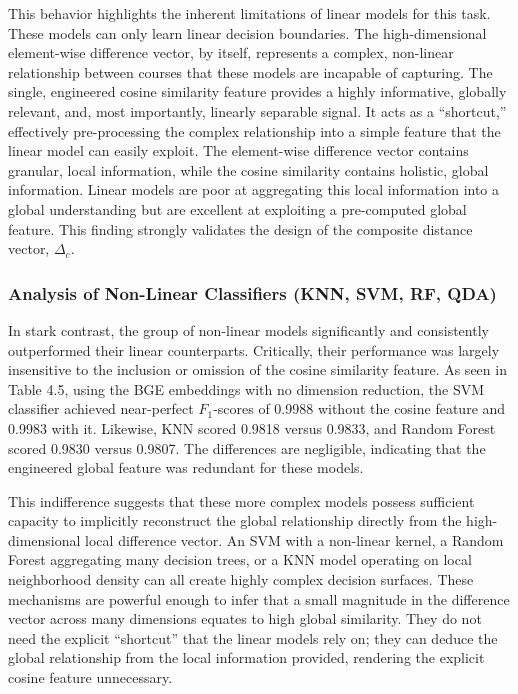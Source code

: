 This behavior highlights the inherent limitations of linear models for this task. These models can only learn linear decision boundaries. The high-dimensional element-wise difference vector, by itself, represents a complex, non-linear relationship between courses that these models are incapable of capturing. The single, engineered cosine similarity feature provides a highly informative, globally relevant, and, most importantly, linearly separable signal. It acts as a ``shortcut,'' effectively pre-processing the complex relationship into a simple feature that the linear model can easily exploit. The element-wise difference vector contains granular, local information, while the cosine similarity contains holistic, global information. Linear models are poor at aggregating this local information into a global understanding but are excellent at exploiting a pre-computed global feature. This finding strongly validates the design of the composite distance vector, \(\Delta_c\).

\subsubsection{Analysis of Non-Linear Classifiers (KNN, SVM, RF, QDA)}
In stark contrast, the group of non-linear models significantly and consistently outperformed their linear counterparts. Critically, their performance was largely insensitive to the inclusion or omission of the cosine similarity feature. As seen in Table 4.5, using the BGE embeddings with no dimension reduction, the SVM classifier achieved near-perfect \(F_1\)-scores of 0.9988 without the cosine feature and 0.9983 with it. Likewise, KNN scored 0.9818 versus 0.9833, and Random Forest scored 0.9830 versus 0.9807. The differences are negligible, indicating that the engineered global feature was redundant for these models.

This indifference suggests that these more complex models possess sufficient capacity to implicitly reconstruct the global relationship directly from the high-dimensional local difference vector. An SVM with a non-linear kernel, a Random Forest aggregating many decision trees, or a KNN model operating on local neighborhood density can all create highly complex decision surfaces. These mechanisms are powerful enough to infer that a small magnitude in the difference vector across many dimensions equates to high global similarity. They do not need the explicit ``shortcut'' that the linear models rely on; they can deduce the global relationship from the local information provided, rendering the explicit cosine feature unnecessary.

